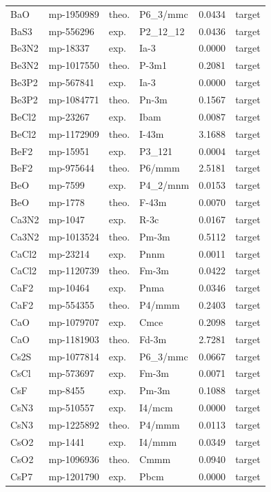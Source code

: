 \begin{longtable}{@{}lllllr@{}}
BaO & mp-1950989 & theo. & P6\_3/mmc & 0.0434 & target \\
BaS3 & mp-556296 & exp. & P2\_12\_12 & 0.0436 & target \\
Be3N2 & mp-18337 & exp. & Ia-3 & 0.0000 & target \\
Be3N2 & mp-1017550 & theo. & P-3m1 & 0.2081 & target \\
Be3P2 & mp-567841 & exp. & Ia-3 & 0.0000 & target \\
Be3P2 & mp-1084771 & theo. & Pn-3m & 0.1567 & target \\
BeCl2 & mp-23267 & exp. & Ibam & 0.0087 & target \\
BeCl2 & mp-1172909 & theo. & I-43m & 3.1688 & target \\
BeF2 & mp-15951 & exp. & P3\_121 & 0.0004 & target \\
BeF2 & mp-975644 & theo. & P6/mmm & 2.5181 & target \\
BeO & mp-7599 & exp. & P4\_2/mnm & 0.0153 & target \\
BeO & mp-1778 & theo. & F-43m & 0.0070 & target \\
Ca3N2 & mp-1047 & exp. & R-3c & 0.0167 & target \\
Ca3N2 & mp-1013524 & theo. & Pm-3m & 0.5112 & target \\
CaCl2 & mp-23214 & exp. & Pnnm & 0.0011 & target \\
CaCl2 & mp-1120739 & theo. & Fm-3m & 0.0422 & target \\
CaF2 & mp-10464 & exp. & Pnma & 0.0346 & target \\
CaF2 & mp-554355 & theo. & P4/mmm & 0.2403 & target \\
CaO & mp-1079707 & exp. & Cmce & 0.2098 & target \\
CaO & mp-1181903 & theo. & Fd-3m & 2.7281 & target \\
Cs2S & mp-1077814 & exp. & P6\_3/mmc & 0.0667 & target \\
CsCl & mp-573697 & exp. & Fm-3m & 0.0071 & target \\
CsF & mp-8455 & exp. & Pm-3m & 0.1088 & target \\
CsN3 & mp-510557 & exp. & I4/mcm & 0.0000 & target \\
CsN3 & mp-1225892 & theo. & P4/mmm & 0.0113 & target \\
CsO2 & mp-1441 & exp. & I4/mmm & 0.0349 & target \\
CsO2 & mp-1096936 & theo. & Cmmm & 0.0940 & target \\
CsP7 & mp-1201790 & exp. & Pbcm & 0.0000 & target \\

\end{longtable}

